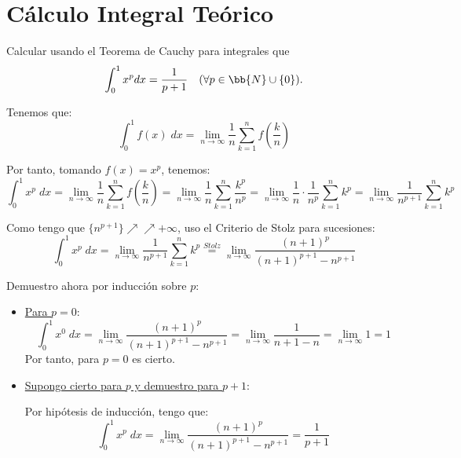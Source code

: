 \section{Cálculo Integral Teórico}

\begin{ejercicio} Calcular usando el Teorema de Cauchy para integrales que
\begin{equation*}
    \int_0^1 x^pdx = \frac{1}{p+1} \quad (\forall p\in \bb{N}\cup\{0\}).
\end{equation*}

Tenemos que:
\begin{equation*}
    \int_0^1 f(x)\;dx = \lim_{n\to \infty} \frac{1}{n}\sum_{k=1}^n f\left(\frac{k}{n}\right)
\end{equation*}

Por tanto, tomando $f(x)=x^p$, tenemos:
\begin{equation*}
    \int_0^1 x^p\;dx
    = \lim_{n\to \infty} \frac{1}{n}\sum_{k=1}^n f\left(\frac{k}{n}\right)
    = \lim_{n\to \infty} \frac{1}{n} \sum_{k=1}^n \frac{k^p}{n^p}
    = \lim_{n\to \infty} \frac{1}{n}\cdot \frac{1}{n^p} \sum_{k=1}^n k^p
    = \lim_{n\to \infty} \frac{1}{n^{p+1}} \sum_{k=1}^n k^p
\end{equation*}

Como tengo que $\{n^{p+1}\}\nearrow\nearrow +\infty$, uso el Criterio de Stolz para sucesiones:
\begin{equation*}
    \int_0^1 x^p\;dx
    = \lim_{n\to \infty} \frac{1}{n^{p+1}} \sum_{k=1}^n k^p
    \stackrel{Stolz}{=} \lim_{n\to \infty} \frac{(n+1)^p}{(n+1)^{p+1} -n^{p+1}}
\end{equation*}

Demuestro ahora por inducción sobre $p$:
\begin{itemize}
    \item \underline{Para $p=0$}:
    \begin{equation*}
        \int_0^1 x^0\;dx
        = \lim_{n\to \infty} \frac{(n+1)^p}{(n+1)^{p+1} -n^{p+1}}
        = \lim_{n\to \infty} \frac{1}{n+1 -n}
        = \lim_{n\to \infty} 1 = 1
    \end{equation*}
    Por tanto, para $p=0$ es cierto.

    \item \underline{Supongo cierto para $p$ y demuestro para $p+1$}:

    Por hipótesis de inducción, tengo que:
    \begin{equation*}
       \int_0^1 x^{p}\;dx = \lim_{n\to \infty} \frac{(n+1)^p}{(n+1)^{p+1} -n^{p+1}}
        = \frac{1}{p+1}
    \end{equation*}


\end{itemize}
\end{ejercicio}
